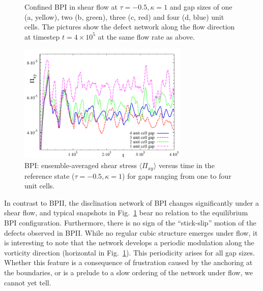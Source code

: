 \documentclass[12pt,twoside]{iopart}
\newcommand{\ex}[1]{\times10^{#1}}
\begin{document}
\begin{figure}[h]
\caption{Confined BPI in shear flow at $\tau=-0.5, \kappa=1$ and gap sizes of one (a, yellow), two (b, green), three (c, red) and four (d, blue) unit cells. The pictures show the defect network along the flow direction at timestep $t=4\ex{5}$ at the same flow rate as above.}
\label{fig4}
\end{figure}


\begin{figure}[h]
\centering
\includegraphics[width=0.725\textwidth]{stress_bp1_fbc.pdf}
\caption{BPI: ensemble-averaged shear stress $\langle \Pi_{xy}\rangle$
versus time in the reference state ($\tau=-0.5, \kappa=1$) for gaps
ranging from one to four unit cells.}
\label{fig5}
\end{figure}

In contrast to BPII, the disclination network of BPI changes significantly
under a shear flow, and typical snapshots in Fig.~\ref{fig4} bear no
relation to the equilibrium BPI configuration. Furthermore, there is no sign of the ``stick-slip'' motion of the defects observed in BPII. While no regular cubic structure emerges under flow, it is interesting to note that the network develops a periodic modulation along the vorticity direction (horizontal in Fig.~\ref{fig4}). This periodicity arises for all gap sizes. Whether this feature is a consequence of frustration caused by the anchoring at the boundaries, or is a prelude to a slow ordering of the network under flow, we cannot yet tell.
\end{document}

